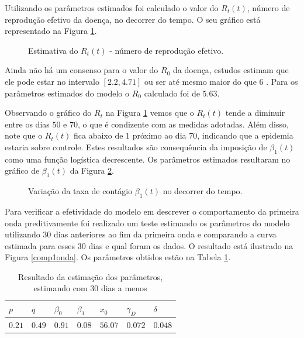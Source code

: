 \documentclass[12pt]{article}
\begin{document}
Utilizando os parâmetros estimados foi calculado o valor do $R_t(t)$, número de reprodução efetivo da doença, no decorrer do tempo. O seu gráfico está representado na Figura \ref{rt1}. 

\begin{figure}[h!]
    \centering
    
    \caption{Estimativa do $R_t(t)$ - número de reprodução efetivo.}
    \label{rt1}
\end{figure}

Ainda não há um consenso para o valor do $R_0$ da doença, estudos estimam que ele pode estar no intervalo $[2.2, 4.71] $ ou ser até mesmo maior do que 6 \cite{barbarossa2020modeling}. Para os parâmetros estimados do modelo o $R_0$ calculado foi de $5.63$. 

Observando o gráfico do $R_t$ na Figura \ref{rt1} vemos que o $R_t(t)$ tende a diminuir entre os dias $50$ e $70$, o que é condizente com as medidas adotadas. Além disso, note que o $R_t(t)$ fica abaixo de $1$ próximo ao dia $70$, indicando que a epidemia estaria sobre controle. Estes resultados são consequência da imposição de $\beta_1(t)$ como uma função logística decrescente. Os parâmetros estimados resultaram no gráfico de $\beta_1(t)$ da Figura \ref{beta1t}.

\begin{figure}[h!]
    \centering
    
    \caption{Variação da taxa de contágio $\beta_1(t)$ no decorrer do tempo.} 
    \label{beta1t}
\end{figure}

Para verificar a efetividade do modelo em descrever o comportamento da primeira onda preditivamente foi realizado um teste estimando os parâmetros do modelo utilizando $30$ dias anteriores ao fim da primeira onda e comparando a curva estimada para esses $30$ dias e qual foram os dados. O resultado está ilustrado na Figura \ref{comp1onda}. Os parâmetros obtidos estão na Tabela \ref{Tabcomp1onda}.

\begin{table}[h]
\centering
\begin{small}
\caption{Resultado da estimação dos parâmetros, estimando com 30 dias a menos} \label{Tabcomp1onda}
\begin{tabular}{|p{2cm}|p{2cm}|p{2cm}|p{2cm}|p{2cm}|p{2cm}|p{2cm}|}
\hline
 $p$ & $q$ & $\beta_0$ & $\beta_1$ & $x_0$ & $\gamma_D$ & $\delta$\\
\hline
 $0.21$ & $0.49$ & $0.91$ & $0.08$ & $56.07$ & $0.072$ & $0.048$\\
\hline
\end{tabular}
\end{small}
\end{table}
\end{document}

